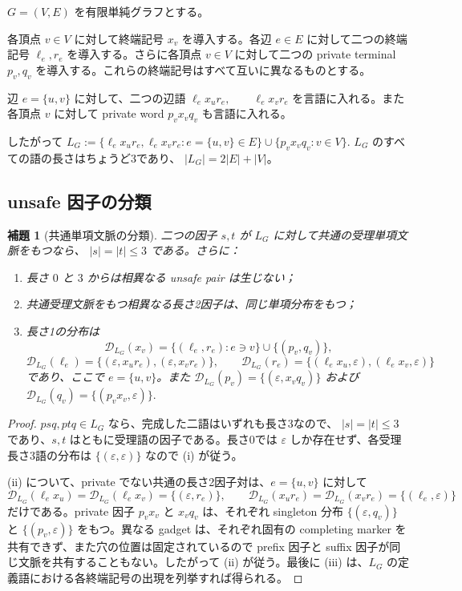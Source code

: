 \documentclass[10pt,a4paper]{ltjsarticle}
\newtheorem{lemma}[theorem]{補題}
\theoremstyle{definition}
\theoremstyle{remark}
\newcommand{\D}{\mathcal D}
\begin{document}
\(G=(V,E)\) を有限単純グラフとする。

各頂点 \(v\in V\) に対して終端記号 \(x_v\) を導入する。各辺 \(e\in E\) に対して二つの終端記号 \(\ell_e,r_e\) を導入する。さらに各頂点 \(v\in V\) に対して二つの private terminal \(p_v,q_v\) を導入する。これらの終端記号はすべて互いに異なるものとする。

辺 \(e=\{u,v\}\) に対して、二つの辺語
\(\ell_e x_u r_e, \qquad \ell_e x_v r_e\)
を言語に入れる。また各頂点 \(v\) に対して private word \(p_vx_vq_v\) も言語に入れる。

したがって
\(
L_G
:=
\{
\ell_ex_ur_e,\ell_ex_vr_e:
e=\{u,v\}\in E
\}
\cup
\{
p_vx_vq_v:v\in V
\}.
\)
$L_G$ のすべての語の長さはちょうど3であり、
\(|L_G|=2|E|+|V|\)。

\subsection{unsafe 因子の分類}

\begin{lemma}[共通単項文脈の分類]
\label{graph:lem:factor-classification}
二つの因子 $s,t$ が $L_G$ に対して共通の受理単項文脈をもつなら、
$|s|=|t|\le3$ である。さらに：
\begin{enumerate}[label=\textup{(\roman*)},leftmargin=*]
\item 長さ $0$ と $3$ からは相異なる unsafe pair は生じない；
\item 共通受理文脈をもつ相異なる長さ2因子は、同じ単項分布をもつ；
\item 長さ1の分布は
\[
\D_{L_G}(x_v)=\{(\ell_e,r_e):e\ni v\}\cup\{(p_v,q_v)\},
\]
\[
\D_{L_G}(\ell_e)=\{(\varepsilon,x_ur_e),(\varepsilon,x_vr_e)\},
\qquad
\D_{L_G}(r_e)=\{(\ell_ex_u,\varepsilon),(\ell_ex_v,\varepsilon)\}
\]
であり、ここで $e=\{u,v\}$。また
\(
\D_{L_G}(p_v)=\{(\varepsilon,x_vq_v)\}
\)
および
\(
\D_{L_G}(q_v)=\{(p_vx_v,\varepsilon)\}.
\)
\end{enumerate}
\end{lemma}

\begin{proof}
$psq,ptq\in L_G$ なら、完成した二語はいずれも長さ3なので、
$|s|=|t|\le3$ であり、$s,t$ はともに受理語の因子である。長さ0では $\varepsilon$ しか存在せず、各受理長さ3語の分布は
$\{(\varepsilon,\varepsilon)\}$
なので \textup{(i)} が従う。

\textup{(ii)} について、private でない共通の長さ2因子対は、$e=\{u,v\}$ に対して
\[
\D_{L_G}(\ell_ex_u)=\D_{L_G}(\ell_ex_v)=\{(\varepsilon,r_e)\},
\qquad
\D_{L_G}(x_ur_e)=\D_{L_G}(x_vr_e)=\{(\ell_e,\varepsilon)\}
\]
だけである。private 因子 $p_vx_v$ と $x_vq_v$ は、それぞれ singleton 分布
$\{(\varepsilon,q_v)\}$ と $\{(p_v,\varepsilon)\}$
をもつ。異なる gadget は、それぞれ固有の completing marker を共有できず、また穴の位置は固定されているので prefix 因子と suffix 因子が同じ文脈を共有することもない。したがって \textup{(ii)} が従う。最後に \textup{(iii)} は、$L_G$ の定義語における各終端記号の出現を列挙すれば得られる。
\end{proof}
\end{document}
